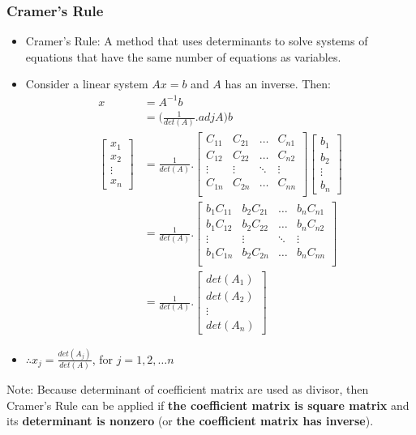 \documentclass[a4paper,12pt]{article}
\begin{document}
\subsubsection*{Cramer’s Rule}
\begin{itemize}
  \item Cramer’s Rule: A method that uses determinants to solve systems of equations that have the same number of equations as variables.
  \item Consider a linear system \(Ax=b\) and \(A\) has an inverse. Then:
  \begin{align*}
    x & = A^{-1} b \\
    & = \Bigg(\frac{1}{det(A)}.adj A\Bigg)b \\ 
    \begin{bmatrix}
      x_1 \\ x_2 \\ \vdots \\ x_n
    \end{bmatrix} & = \frac{1}{det(A)}.\begin{bmatrix}
      C_{11} & C_{21} & \dots  & C_{n1} \\
      C_{12} & C_{22} & \dots  & C_{n2} \\
      \vdots & \vdots & \ddots & \vdots \\
      C_{1n} & C_{2n} & \dots  & C_{nn} \\
    \end{bmatrix} \begin{bmatrix}
      b_1 \\ b_2 \\ \vdots \\ b_n
    \end{bmatrix} \\
    & = \frac{1}{det(A)}.\begin{bmatrix}
      b_1C_{11} & b_2C_{21} & \dots  & b_nC_{n1} \\
      b_1C_{12} & b_2C_{22} & \dots  & b_nC_{n2} \\
      \vdots & \vdots & \ddots & \vdots \\
      b_1C_{1n} & b_2C_{2n} & \dots  & b_nC_{nn} \\
    \end{bmatrix} \\ 
    & = \frac{1}{det(A)}.\begin{bmatrix}
      det(A_1) \\ det(A_2) \\ \vdots \\ det(A_n)
    \end{bmatrix}
  \end{align*}
  \item[] \(\therefore x_j=\frac{det(A_j)}{det(A)}\), for \(j=1,2,\dots n\)
\end{itemize}
Note: Because determinant of coefficient matrix are used as divisor, then Cramer's Rule can be applied if \textbf{the coefficient matrix is square matrix} and its \textbf{determinant is nonzero} (or \textbf{the coefficient matrix has inverse}).
\end{document}

